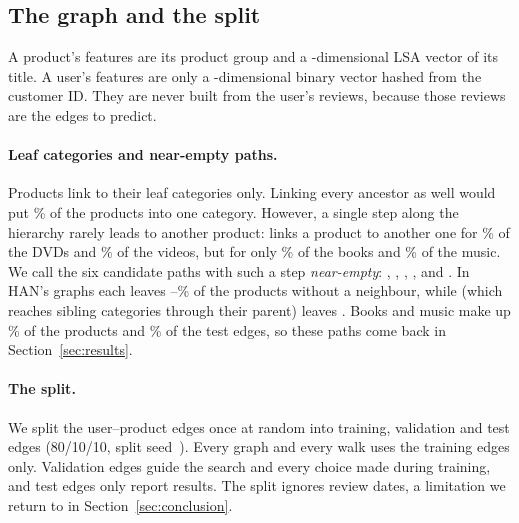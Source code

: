 \subsection{The graph and the split}

A product's features are its product group and a -dimensional LSA vector of its
title. A user's features are only a -dimensional binary vector hashed from the
customer ID. They are never built from the user's reviews, because those reviews are the edges to
predict.

\paragraph{Leaf categories and near-empty paths.} Products link to their leaf categories only.
Linking every ancestor as well would put \% of the products into one
category. However, a single step along the hierarchy rarely leads to
another product:  links a product to another one for \% of the
DVDs and \% of the videos, but for only \% of the
books and \% of the music. We call the six candidate paths with such a
step \emph{near-empty}: , , , ,  and
. In HAN's graphs each leaves
--\% of the products without a neighbour,
while  (which reaches sibling categories through their parent) leaves
. Books and music make up \% of the products and
\% of the test edges, so these paths come back in Section~\ref{sec:results}.

\paragraph{The split.} We split the  user--product edges once at random into
 training,  validation and  test edges (80/10/10,
split seed~). Every graph and every walk uses the training edges only. Validation
edges guide the search and every choice made during training, and test edges only report results.
The split ignores review dates, a limitation we return to in Section~\ref{sec:conclusion}.
